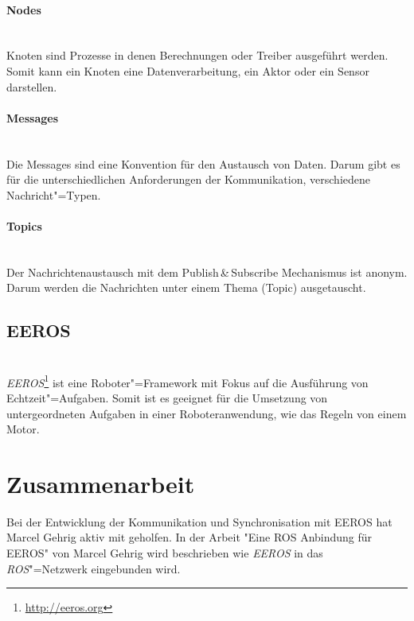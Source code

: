 \paragraph*{Nodes} \mbox{}\\
Knoten sind Prozesse in denen Berechnungen oder Treiber ausgeführt werden. 
Somit kann ein Knoten eine Datenverarbeitung, ein Aktor oder ein Sensor darstellen.  

\paragraph*{Messages} \mbox{}\\
Die Messages sind eine Konvention für den Austausch von Daten.
Darum gibt es für die unterschiedlichen Anforderungen der Kommunikation, verschiedene Nachricht"=Typen.

\paragraph*{Topics} \mbox{}\\
Der Nachrichtenaustausch mit dem Publish\,\&\,Subscribe Mechanismus ist anonym.
Darum werden die Nachrichten unter einem Thema (Topic) ausgetauscht.

\subsection{EEROS} \mbox{}\\
\textit{EEROS}\footnote{\url{http://eeros.org}} ist eine Roboter"=Framework mit Fokus auf die Ausführung von Echtzeit"=Aufgaben.
Somit ist es geeignet für die Umsetzung von untergeordneten Aufgaben in einer Roboteranwendung, wie das Regeln von einem Motor.


\section{Zusammenarbeit}
Bei der Entwicklung der Kommunikation und Synchronisation mit EEROS hat Marcel Gehrig aktiv mit geholfen.
In der Arbeit \textsc{"}Eine ROS Anbindung für EEROS\textsc{"} von Marcel Gehrig wird beschrieben wie \textit{EEROS} in das \textit{ROS}"=Netzwerk eingebunden wird.

